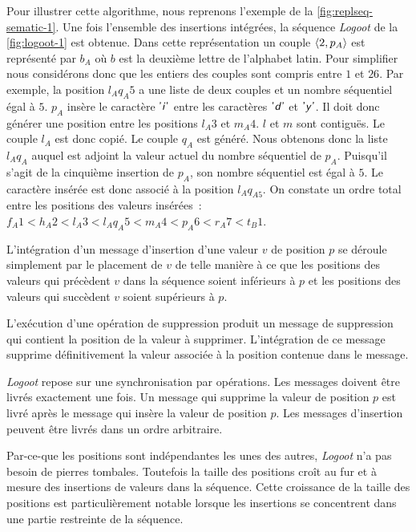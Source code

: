 Pour illustrer cette algorithme, nous reprenons l'exemple de la \autoref{fig:replseq-sematic-1}.
Une fois l'ensemble des insertions intégrées, la séquence \emph{Logoot} de la \autoref{fig:logoot-1} est obtenue.
Dans cette représentation un couple $\tuple*{2, p_A}$ est représenté par $b_A$ où $b$ est la deuxième lettre de l'alphabet latin.
Pour simplifier nous considérons donc que les entiers des couples sont compris entre $1$ et $26$.
Par exemple, la position $l_A q_A5$ a une liste de deux couples et un nombre séquentiel égal à $5$.
$p_A$ insère le caractère $\textsf{'\textit{i}'}$ entre les caractères $\textsf{'\textit{d}'}$ et $\textsf{'\textit{y}'}$.
Il doit donc générer une position entre les positions $l_A3$ et $m_A4$.
$l$ et $m$ sont contiguës.
Le couple $l_A$ est donc copié.
Le couple $q_A$ est généré.
Nous obtenons donc la liste $l_A q_A$ auquel est adjoint la valeur actuel du nombre séquentiel de $p_A$.
Puisqu'il s'agit de la cinquième insertion de $p_A$, son nombre séquentiel est égal à $5$.
Le caractère insérée est donc associé à la position $l_A q_{A5}$.
On constate un ordre total entre les positions des valeurs insérées~: $f_A1 < h_A2 < l_A3 < l_A q_A5 < m_A4 < p_A6 < r_A7 < t_B1$.

L'intégration d'un message d'insertion d'une valeur $v$ de position $p$ se déroule simplement par le placement de $v$ de telle manière à ce que les positions des valeurs qui précèdent $v$ dans la séquence soient inférieurs à $p$ et les positions des valeurs qui succèdent $v$ soient supérieurs à $p$.

L'exécution d'une opération de suppression produit un message de suppression qui contient la position de la valeur à supprimer.
L'intégration de ce message supprime définitivement la valeur associée à la position contenue dans le message.

\emph{Logoot} repose sur une synchronisation par opérations.
Les messages doivent être livrés exactement une fois.
Un message qui supprime la valeur de position $p$ est livré après le message qui insère la valeur de position $p$.
Les messages d'insertion peuvent être livrés dans un ordre arbitraire.

Par-ce-que les positions sont indépendantes les unes des autres, \emph{Logoot} n'a pas  besoin de pierres tombales.
Toutefois la taille des positions croît au fur et à mesure des insertions de valeurs dans la séquence.
Cette croissance de la taille des positions est particulièrement notable lorsque les insertions se concentrent dans une partie restreinte de la séquence.

